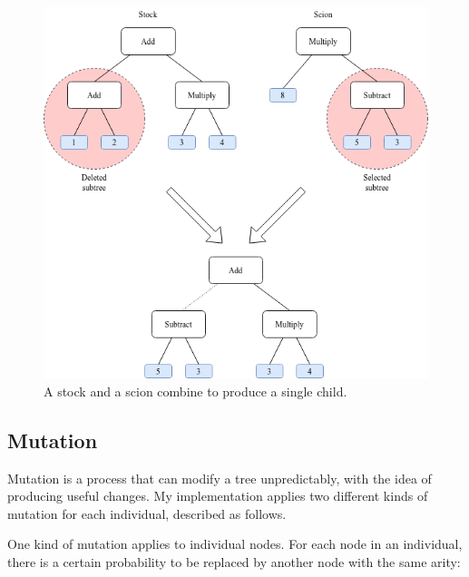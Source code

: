 \documentclass{report}
\begin{document}
\begin{figure}[ht]
    \centering
    \includegraphics[scale=0.60]{crossover}
    \caption{A stock and a scion combine to produce a single child.}
\end{figure}

\subsection{Mutation}

Mutation is a process that can modify a tree unpredictably, with the idea of producing useful changes. My implementation applies two different kinds of mutation for each individual, described as follows.

One kind of mutation applies to individual nodes. For each node in an individual, there is a certain probability to be replaced by another node with the same arity:
\end{document}
